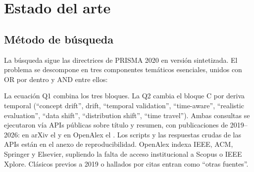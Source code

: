 \section{Estado del arte}

\subsection{Método de búsqueda}
La búsqueda sigue las directrices de PRISMA 2020 \cite{Page2021} en versión sintetizada. El problema se descompone en tres componentes temáticos esenciales, unidos con OR por dentro y AND entre ellos:

\noindent{}

\smallskip
La ecuación Q1 combina los tres bloques. La Q2 cambia el bloque C por deriva temporal (``concept drift'', drift, ``temporal validation'', ``time-aware'', ``realistic evaluation'', ``data shift'', ``distribution shift'', ``time travel''). Ambas consultas se ejecutaron vía APIs públicas sobre título y resumen, con publicaciones de 2019--2026: en arXiv el \fechaConsulta{} y en OpenAlex el \fechaConsultaOa{}. Los scripts y las respuestas crudas de las APIs están en el anexo de reproducibilidad. OpenAlex indexa IEEE, ACM, Springer y Elsevier, supliendo la falta de acceso institucional a Scopus o IEEE Xplore. Clásicos previos a 2019 o hallados por citas entran como ``otras fuentes''.

